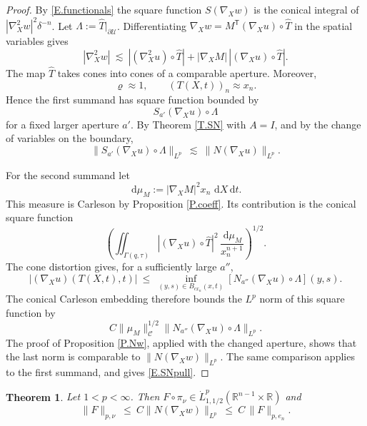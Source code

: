 \documentclass[12pt,leqno]{amsart}
\numberwithin{equation}{section}
\newcommand{\R}{\mathbb R}
\newcommand{\abs}[1]{\left\vert#1\right\vert}
\newcommand{\pd}{\partial}
\newcommand{\Uc}{\mathcal U}
\newcommand{\Cc}{\mathcal C}
\newcommand{\Gam}{\Gamma}
\renewcommand{\d}{\,\mathrm d}
\newcommand{\Cnorm}[1]{\|#1\|_{\Cc}}
\theoremstyle{plain}
\newtheorem{theorem}[equation]{Theorem}
\theoremstyle{remark}
\begin{document}
\begin{proof}
By \eqref{E.functionals} the square function $S(\nabla_Xw)$ is the conical
integral of $\abs{\nabla_X^2w}^2\delta^{-n}$. Let
$\Lambda:=\widehat T|_{\pd\Uc}$.
Differentiating $\nabla_Xw=M^{\mathsf T}(\nabla_Xu)\circ\widehat T$ in the spatial
variables gives
$$
  \abs{\nabla_X^2w}\ \lesssim\
  \abs{(\nabla_X^2u)\circ\widehat T}
  +\abs{\nabla_XM}\,\abs{(\nabla_Xu)\circ\widehat T} .
$$
The map $\widehat T$ takes cones into cones of a comparable aperture. Moreover,
$$
  \varrho\approx1,\qquad (T(X,t))_n\approx x_n .
$$
Hence the first summand has square function bounded by
$$
  S_{a'}(\nabla_Xu)\circ\Lambda
$$
for a fixed larger aperture $a'$. By Theorem \ref{T.SN} with $A=I$, and by
the change of variables on the boundary,
$$
  \big\|S_{a'}(\nabla_Xu)\circ\Lambda\big\|_{L^p}
  \ \lesssim\ \big\|N(\nabla_Xu)\big\|_{L^p} .
$$

For the second summand let
$$
  \d\mu_M:=\abs{\nabla_XM}^2x_n\,\d X\d t .
$$
This measure is Carleson by Proposition \ref{P.coeff}. Its contribution is
the conical square function
$$
 \left(\iint_{\Gam(q,\tau)}
   \abs{(\nabla_Xu)\circ\widehat T}^2\,
   \frac{\d\mu_M}{x_n^{n+1}}\right)^{1/2}.
$$
The cone distortion gives, for a sufficiently large $a''$,
$$
  \abs{(\nabla_Xu)(T(X,t),t)}\ \le\
  \inf_{(y,s)\in B_{c x_n}(x,t)}
  \left[N_{a''}(\nabla_Xu)\circ\Lambda\right](y,s).
$$
The conical Carleson embedding \cite[Theorem 3]{CMS} therefore bounds the
$L^p$ norm of this square function by
$$
  C\Cnorm{\mu_M}^{1/2}
  \big\|N_{a''}(\nabla_Xu)\circ\Lambda\big\|_{L^p}.
$$
The proof of Proposition \ref{P.Nw}, applied with the changed aperture,
shows that the last norm is comparable to
$\|N(\nabla_Xw)\|_{L^p}$. The same comparison applies to the first
summand, and gives \eqref{E.SNpull}.
\end{proof}

\begin{theorem}\label{T.trace}
Let $1<p<\infty$. Then $F\circ\pi_\nu\in\dot L^p_{1,1/2}(\R^{n-1}\times\R)$ and
\begin{equation}\label{E.trace}
  \|F\|_{p,\nu}\ \le\ C\big\|N(\nabla_Xw)\big\|_{L^p}\ \le\ C\,\|F\|_{p,e_n} .
\end{equation}
\end{theorem}
\end{document}
